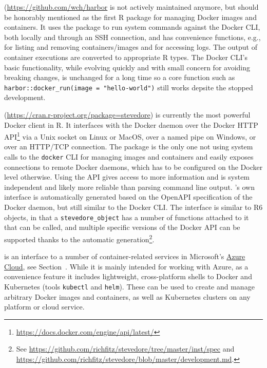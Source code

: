 \textbf{} (\url{https://github.com/wch/harbor} is not
actively maintained anymore, but should be honorably mentioned as the
first R package for managing Docker images and containers. It uses the
 package to run system commands against the Docker CLI,
both locally and through an SSH connection, and has convenience
functions, e.g., for listing and removing containers/images and for
accessing logs. The output of container executions are converted to
appropriate R types. The Docker CLI's basic functionality, while
evolving quickly and with small concern for avoiding breaking changes,
is unchanged for a long time so a core function such as
\texttt{harbor::docker\_run(image\ =\ "hello-world")} still works
depsite the stopped development.

\textbf{}
(\url{https://cran.r-project.org/package=stevedore}) is currently the
most powerful Docker client in R. It interfaces with the Docker daemon
over the Docker HTTP
API\footnote{\href{https://docs.docker.com/engine/api/latest/}{https://docs.docker.com/engine/api/latest/}}
via a Unix socket on Linux or MacOS, over a named pipe on Windows, or
over an HTTP/TCP connection. The package is the only one not using
system calls to the \texttt{docker} CLI for managing images and
containers and easily exposes connections to remote Docker daemons,
which has to be configured on the Docker level otherwise. Using the API
gives access to more information and is system independent and likely
more reliable than parsing command line output. 's
own interface is automatically generated based on the OpenAPI
specification of the Docker daemon, but still similar to the Docker CLI.
The interface is similar to R6 objects, in that a
\texttt{stevedore\_object} has a number of functions attached to it that
can be called, and multiple specific versions of the Docker API can be
supported thanks to the automatic
generation\footnote{See \href{https://github.com/richfitz/stevedore/tree/master/inst/spec}{https://github.com/richfitz/stevedore/tree/master/inst/spec} and \href{https://github.com/richfitz/stevedore/blob/master/development.md}{https://github.com/richfitz/stevedore/blob/master/development.md}.}.

\textbf{} is an interface to a number of
container-related services in Microsoft's
\href{https://azure.microsoft.com/}{Azure Cloud}, see
Section~. While it is mainly intended for
working with Azure, as a convenience feature it includes lightweight,
cross-platform shells to Docker and Kubernetes (tools \texttt{kubectl}
and \texttt{helm}). These can be used to create and manage arbitrary
Docker images and containers, as well as Kubernetes clusters on any
platform or cloud service.

